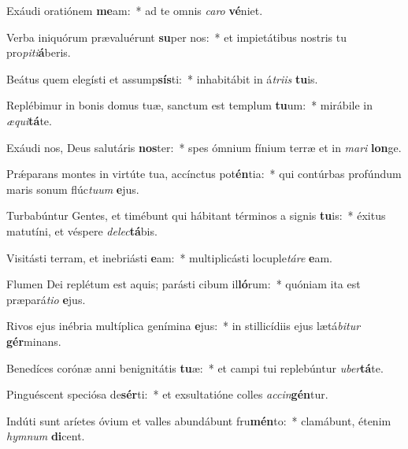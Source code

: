 \item Exáudi oratiónem \textbf{me}am:~* ad te omnis \textit{ca}\textit{ro} \textbf{vé}niet.
\item Verba iniquórum prævaluérunt \textbf{su}per nos:~* et impietátibus nostris tu pro\textit{pi}\textit{ti}\textbf{á}beris.
\item Beátus quem elegísti et assump\textbf{sís}ti:~* inhabitábit in á\textit{tri}\textit{is} \textbf{tu}is.
\item Replébimur in bonis domus tuæ, sanctum est templum \textbf{tu}um:~* mirábile in \textit{æ}\textit{qui}\textbf{tá}te.
\item Exáudi nos, Deus salutáris \textbf{nos}ter:~* spes ómnium fínium terræ et in \textit{ma}\textit{ri} \textbf{lon}ge.
\item Prǽparans montes in virtúte tua, accínctus pot\textbf{én}tia:~* qui contúrbas profúndum maris sonum flúc\textit{tu}\textit{um} \textbf{e}jus.
\item Turbabúntur Gentes, et timébunt qui hábitant términos a signis \textbf{tu}is:~* éxitus matutíni, et véspere \textit{de}\textit{lec}\textbf{tá}bis.
\item Visitásti terram, et inebriásti \textbf{e}am:~* multiplicásti locuple\textit{tá}\textit{re} \textbf{e}am.
\item Flumen Dei replétum est aquis; parásti cibum il\textbf{ló}rum:~* quóniam ita est præpará\textit{ti}\textit{o} \textbf{e}jus.
\item Rivos ejus inébria multíplica genímina \textbf{e}jus:~* in stillicídiis ejus lætá\textit{bi}\textit{tur} \textbf{gér}minans.
\item Benedíces corónæ anni benignitátis \textbf{tu}æ:~* et campi tui replebúntur \textit{u}\textit{ber}\textbf{tá}te.
\item Pinguéscent speciósa de\textbf{sér}ti:~* et exsultatióne colles \textit{ac}\textit{cin}\textbf{gén}tur.
\item Indúti sunt aríetes óvium et valles abundábunt fru\textbf{mén}to:~* clamábunt, étenim \textit{hym}\textit{num} \textbf{di}cent.

